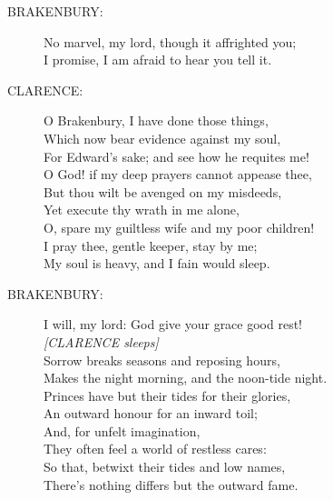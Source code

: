 \documentclass{article}
\begin{document}
\begin{description}
\item[BRAKENBURY:] 
\hspace{1pt}No marvel, my lord, though it affrighted you;\\
\hspace{1pt}I promise, I am afraid to hear you tell it.\\
\end{description}
\begin{description}
\item[CLARENCE:] 
\hspace{1pt}O Brakenbury, I have done those things,\\
\hspace{1pt}Which now bear evidence against my soul,\\
\hspace{1pt}For Edward's sake; and see how he requites me!\\
\hspace{1pt}O God! if my deep prayers cannot appease thee,\\
\hspace{1pt}But thou wilt be avenged on my misdeeds,\\
\hspace{1pt}Yet execute thy wrath in me alone,\\
\hspace{1pt}O, spare my guiltless wife and my poor children!\\
\hspace{1pt}I pray thee, gentle keeper, stay by me;\\
\hspace{1pt}My soul is heavy, and I fain would sleep.\\
\end{description}
\begin{description}
\item[BRAKENBURY:] 
\hspace{1pt}I will, my lord: God give your grace good rest!\\
{\it [CLARENCE sleeps]}\\
\hspace{1pt}Sorrow breaks seasons and reposing hours,\\
\hspace{1pt}Makes the night morning, and the noon-tide night.\\
\hspace{1pt}Princes have but their tides for their glories,\\
\hspace{1pt}An outward honour for an inward toil;\\
\hspace{1pt}And, for unfelt imagination,\\
\hspace{1pt}They often feel a world of restless cares:\\
\hspace{1pt}So that, betwixt their tides and low names,\\
\hspace{1pt}There's nothing differs but the outward fame.\\
\end{description}
\end{document}
